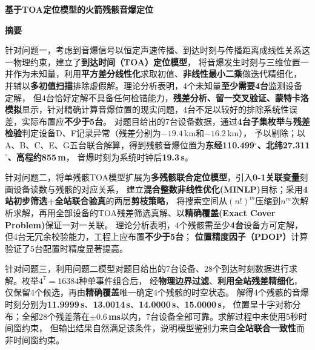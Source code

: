 \documentclass[draft,12pt,a4paper]{ctexart}
\theoremstyle{definition}
\begin{document}
\newcommand{\keywords}[1]{\par\vspace{6pt}\noindent\textbf{关键词：#1}\par}

\renewcommand{\lstlistingname}{代码}

\begin{center}
  {\huge\bfseries 基于\textbf{TOA定位模型}的\textbf{火箭残骸音爆定位}\par}
\end{center}


\begin{center}
  {\bfseries \textbf{摘\quad 要}}
\end{center}
\vspace{0.1cm}

针对问题一，考虑到音爆信号以恒定声速传播、到达时刻与传播距离成线性关系这一物理约束，建立了\textbf{到达时间（TOA）定位模型}，
将音爆发生时刻与三维位置一并作为未知量，利用\textbf{平方差分线性化}求取初值、\textbf{非线性最小二乘}做迭代精细化，
并辅以\textbf{多初值扫描}排除虚假解。理论分析表明，4个未知量\textbf{至少需要4台}监测设备定解，
但4台恰好定解不具备任何检错能力，\textbf{残差分析、留一交叉验证、蒙特卡洛模拟}显示，针对精确计算音爆位置的现实问题，4台不足以较好的排除系统性误差，实际布置应\textbf{不少于5台}。
对题目给出的7台设备数据，通过\textbf{4台子集枚举}与\textbf{残差检验}判定设备D、F记录异常（残差分别为$-19.4$\,km和$-16.2$\,km），
予以剔除；以A、B、C、E、G五台联合解算，得到残骸音爆位置为\textbf{东经110.499$^\circ$、北纬27.311$^\circ$、高程约855\,m}，
音爆时刻为系统时钟后\textbf{19.3\,s}。

针对问题二，将单残骸TOA模型扩展为\textbf{多残骸联合定位模型}，引入\textbf{0-1关联变量}刻画设备读数与残骸的对应关系，
建立\textbf{混合整数非线性优化(MINLP)}目标；采用\textbf{4站初步筛选+全站联合验真}的两层\textbf{剪枝策略}，
将搜索空间从$(n!)^m$压缩到$n^m$次解析求解，再用全部设备的TOA残差筛选真解、以\textbf{精确覆盖(Exact Cover Problem)}保证一对一关联。
理论分析表明，4个残骸需至少\textbf{4台}设备方可定解，但4台无冗余校验能力，工程上应布置\textbf{不少于5台}；
\textbf{位置精度因子（PDOP）}计算验证了5台配置时精度显著提高。

针对问题三，利用问题二模型对题目给出的7台设备、28个到达时刻数据进行求解。枚举$4^7=16384$种单事件组合后，
经\textbf{物理边界过滤}、\textbf{利用全站残差精细化}，仅保留4个候选，再由\textbf{精确覆盖}唯一确定4个残骸的时空状态。
解得4个残骸的音爆时刻分别为\textbf{11.9999\,s}、\textbf{13.0014\,s}、\textbf{14.0000\,s}、\textbf{15.0000\,s}，
位置呈十字对称分布；全部28个残差落在\textbf{$\pm0.6$\,ms}以内，7台设备全部可靠。求解过程中未使用5秒时间窗约束，
但输出结果自然满足该条件，说明模型鉴别力来自\textbf{全站联合一致性}而非时间窗约束。
\end{document}
